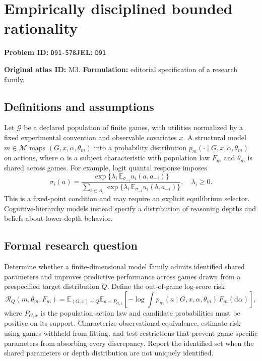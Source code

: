 \documentclass[11pt,a4paper]{article}
\begin{document}
\section*{Empirically disciplined bounded rationality}
\textbf{Problem ID:} \texttt{D91-578}\quad \textbf{JEL:} \texttt{D91}\par
\label{problem:OP-0003}
\label{atlas:prob:M3}

\noindent\textbf{Original atlas ID:} M3. \textbf{Formulation:} editorial specification of a research family.

\subsection*{Definitions and assumptions}

Let $\mathcal G$ be a declared population of finite games, with utilities normalized by a fixed experimental convention and observable covariates $x$. A structural model $m\in\mathcal M$ maps $(G,x,\alpha,\theta_m)$ into a probability distribution $p_m(\cdot\mid G,x,\alpha,\theta_m)$ on actions, where $\alpha$ is a subject characteristic with population law $F_m$ and $\theta_m$ is shared across games. For example, logit quantal response imposes
\[
\sigma_i(a)=\frac{\exp\{\lambda_i\,\mathbb E_{\sigma_{-i}}u_i(a,a_{-i})\}}
 {\sum_{b\in A_i}\exp\{\lambda_i\,\mathbb E_{\sigma_{-i}}u_i(b,a_{-i})\}},\quad\lambda_i\ge0.
\]
This is a fixed-point condition and may require an explicit equilibrium selector. Cognitive-hierarchy models instead specify a distribution of reasoning depths and beliefs about lower-depth behavior.

\subsection*{Formal research question}

Determine whether a finite-dimensional model family admits identified shared parameters and improves predictive performance across games drawn from a prespecified target distribution $Q$. Define the out-of-game log-score risk
\[
\mathcal R_Q(m,\theta_m,F_m)
 =\mathbb E_{(G,x)\sim Q}\mathbb E_{a\sim P_{G,x}}
 \left[-\log\int p_m(a\mid G,x,\alpha,\theta_m)\,F_m(\mathrm d\alpha)\right],
\]
where $P_{G,x}$ is the population action law and candidate probabilities must be positive on its support. Characterize observational equivalence, estimate risk using games withheld from fitting, and test restrictions that prevent game-specific parameters from absorbing every discrepancy. Report the identified set when the shared parameters or depth distribution are not uniquely identified.
\end{document}
